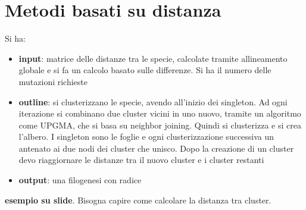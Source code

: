 \documentclass[a4paper,12pt, oneside]{book}
\begin{document}
\section{Metodi basati su distanza}
Si ha:
\begin{itemize}
  \item \textbf{input}: matrice delle distanze tra le specie, calcolate tramite
  allineamento globale e si fa un calcolo basato sulle differenze. Si ha il
  numero delle mutazioni richieste
  \item \textbf{outline}: si clusterizzano le specie, avendo all'inizio dei
  singleton. Ad ogni iterazione si combinano due cluster vicini in uno nuovo,
  tramite un algoritmo come UPGMA, che si basa su neighbor joining. Quindi si
  clusterizza e si crea l'albero. I singleton sono le foglie e ogni
  clusterizzazione successiva un antenato ai due nodi dei cluster che
  unisco. Dopo la creazione di un cluster devo riaggiornare le distanze tra il
  nuovo cluster e i cluster restanti
  \item \textbf{output}: una filogenesi con radice
\end{itemize}
\textbf{esempio su slide}.
Bisogna capire come calcolare la distanza tra cluster.
\end{document}
